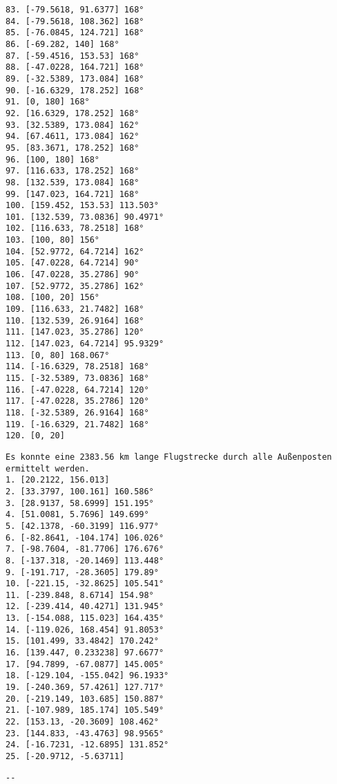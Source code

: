 \documentclass[a4paper,10pt,ngerman]{scrartcl}
\begin{document}
\begin{lstlisting}[frame=single, title=Programmausgabe wenigerkrumm3.txt, breaklines=true,label={lst:lstlisting4}]
83. [-79.5618, 91.6377] 168°
84. [-79.5618, 108.362] 168°
85. [-76.0845, 124.721] 168°
86. [-69.282, 140] 168°
87. [-59.4516, 153.53] 168°
88. [-47.0228, 164.721] 168°
89. [-32.5389, 173.084] 168°
90. [-16.6329, 178.252] 168°
91. [0, 180] 168°
92. [16.6329, 178.252] 168°
93. [32.5389, 173.084] 162°
94. [67.4611, 173.084] 162°
95. [83.3671, 178.252] 168°
96. [100, 180] 168°
97. [116.633, 178.252] 168°
98. [132.539, 173.084] 168°
99. [147.023, 164.721] 168°
100. [159.452, 153.53] 113.503°
101. [132.539, 73.0836] 90.4971°
102. [116.633, 78.2518] 168°
103. [100, 80] 156°
104. [52.9772, 64.7214] 162°
105. [47.0228, 64.7214] 90°
106. [47.0228, 35.2786] 90°
107. [52.9772, 35.2786] 162°
108. [100, 20] 156°
109. [116.633, 21.7482] 168°
110. [132.539, 26.9164] 168°
111. [147.023, 35.2786] 120°
112. [147.023, 64.7214] 95.9329°
113. [0, 80] 168.067°
114. [-16.6329, 78.2518] 168°
115. [-32.5389, 73.0836] 168°
116. [-47.0228, 64.7214] 120°
117. [-47.0228, 35.2786] 120°
118. [-32.5389, 26.9164] 168°
119. [-16.6329, 21.7482] 168°
120. [0, 20]

    \end{lstlisting}

    \begin{lstlisting}[frame=single, title=Programmausgabe wenigerkrumm4.txt, breaklines=true,label={lst:lstlisting4}]
Es konnte eine 2383.56 km lange Flugstrecke durch alle Außenposten ermittelt werden.
1. [20.2122, 156.013]
2. [33.3797, 100.161] 160.586°
3. [28.9137, 58.6999] 151.195°
4. [51.0081, 5.7696] 149.699°
5. [42.1378, -60.3199] 116.977°
6. [-82.8641, -104.174] 106.026°
7. [-98.7604, -81.7706] 176.676°
8. [-137.318, -20.1469] 113.448°
9. [-191.717, -28.3605] 179.89°
10. [-221.15, -32.8625] 105.541°
11. [-239.848, 8.6714] 154.98°
12. [-239.414, 40.4271] 131.945°
13. [-154.088, 115.023] 164.435°
14. [-119.026, 168.454] 91.8053°
15. [101.499, 33.4842] 170.242°
16. [139.447, 0.233238] 97.6677°
17. [94.7899, -67.0877] 145.005°
18. [-129.104, -155.042] 96.1933°
19. [-240.369, 57.4261] 127.717°
20. [-219.149, 103.685] 150.887°
21. [-107.989, 185.174] 105.549°
22. [153.13, -20.3609] 108.462°
23. [144.833, -43.4763] 98.9565°
24. [-16.7231, -12.6895] 131.852°
25. [-20.9712, -5.63711]

    \end{lstlisting}

    \begin{lstlisting}[frame=single, title=Programmausgabe wenigerkrumm5.txt, breaklines=true,label={lst:lstlisting4}]
        --
    \end{lstlisting}
\end{document}
